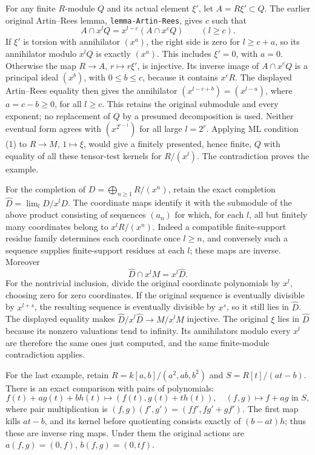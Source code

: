 For any finite \(R\)-module \(Q\) and its actual element \(\xi'\), let \(A=R\xi'\subset Q\). The earlier original Artin--Rees lemma, \texttt{lemma-Artin-Rees}, gives \(c\) such that \[
A\cap x^lQ=x^{l-c}(A\cap x^cQ)\qquad(l\geq c).
\] If \(\xi'\) is torsion with annihilator \((x^a)\), the right side is zero for \(l\geq c+a\), so its annihilator modulo \(x^lQ\) is exactly \((x^a)\). This includes \(\xi'=0\), with \(a=0\). Otherwise the map \(R\to A\), \(r\mapsto r\xi'\), is injective. Its inverse image of \(A\cap x^cQ\) is a principal ideal \((x^b)\), with \(0\leq b\leq c\), because it contains \(x^cR\). The displayed Artin--Rees equality then gives the annihilator \((x^{l-c+b})=(x^{l-a})\), where \(a=c-b\geq0\), for all \(l\geq c\). This retains the original submodule and every exponent; no replacement of \(Q\) by a presumed decomposition is used. Neither eventual form agrees with \((x^{2^{r-1}})\) for all large \(l=2^r\). Applying ML condition (1) to \(R\to M\), \(1\mapsto\xi\), would give a finitely presented, hence finite, \(Q\) with equality of all these tensor-test kernels for \(R/(x^l)\). The contradiction proves the example.

For the completion of \(D=\bigoplus_{n\geq1}R/(x^n)\), retain the exact completion \(\widehat D=\lim_l D/x^lD\). The coordinate maps identify it with the submodule of the above product consisting of sequences \((a_n)\) for which, for each \(l\), all but finitely many coordinates belong to \(x^lR/(x^n)\). Indeed a compatible finite-support residue family determines each coordinate once \(l\geq n\), and conversely such a sequence supplies finite-support residues at each \(l\); these maps are inverse. Moreover \[
\widehat D\cap x^lM=x^l\widehat D.
\] For the nontrivial inclusion, divide the original coordinate polynomials by \(x^l\), choosing zero for zero coordinates. If the original sequence is eventually divisible by \(x^{l+s}\), the resulting sequence is eventually divisible by \(x^s\), so it still lies in \(\widehat D\). The displayed equality makes \(\widehat D/x^l\widehat D\to M/x^lM\) injective. The original \(\xi\) lies in \(\widehat D\) because its nonzero valuations tend to infinity. Its annihilators modulo every \(x^l\) are therefore the same ones just computed, and the same finite-module contradiction applies.

For the last example, retain \(R=k[a,b]/(a^2,ab,b^2)\) and \(S=R[t]/(at-b)\). There is an exact comparison with pairs of polynomials: \[
f(t)+a g(t)+b h(t)\longmapsto(f(t),g(t)+t h(t)),
\quad (f,g)\longmapsto f+a g\text{ in }S,
\] where pair multiplication is \((f,g)(f',g')=(ff',fg'+gf')\). The first map kills \(at-b\), and its kernel before quotienting consists exactly of \((b-at)h\); thus these are inverse ring maps. Under them the original actions are \(a(f,g)=(0,f)\), \(b(f,g)=(0,tf)\).

